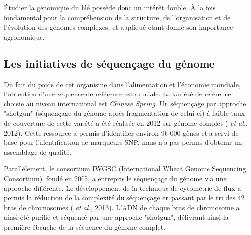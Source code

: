 \documentclass[a4paper, 12pt]{article}
\begin{document}
\begin{onehalfspace}
Étudier la génomique du blé possède donc un intérêt double. À la fois fondamental pour la compréhension de la structure, de l'organisation et de l'évolution des génomes complexes, et appliqué étant donné son importance agronomique.

\subsection{Les initiatives de séquençage du génome}
Du fait du poids de cet organisme dans l'alimentation et l'économie mondiale, l'obtention d'une séquence de référence est cruciale. La variété de référence choisie au niveau international est \textit{Chinese Spring}. Un séquençage par approche "shotgun" (séquençage du génome après fragmentation de celui-ci) à faible taux de couverture de cette variété a été réalisée en 2012 sur génome complet ( \textit{et al.}, 2012). Cette ressource a permis d'identifier environ 96 000 gènes et a servi de base pour l'identification de marqueurs SNP, mais n'a pas permis d'obtenir un assemblage de qualité.

Parallèlement, le consortium IWGSC (International Wheat Genome Sequencing Consortium), fondé en 2005, a entrepris le séquençage du génome via une approche différente. Le développement de la technique de cytométrie de flux a permis la réduction de la complexité du séquençage en passant par le tri des 42 bras de chromosomes ( \textit{et al.}, 2013). L'ADN de chaque bras de chromosome a ainsi été purifié et séquencé par une approche "shotgun", délivrant ainsi la première ébauche de la séquence du génome complet. 


\end{onehalfspace}
\end{document}
